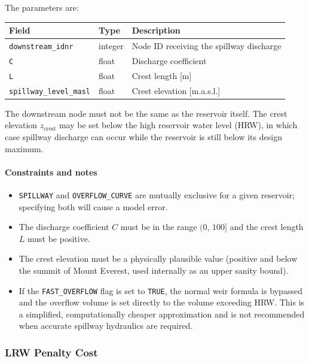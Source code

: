 \documentclass[a4paper, 12pt]{report}
\begin{document}
	\noindent The parameters are:
	\begin{center}
		\begin{tabular}{lll}
			\hline
			Field & Type & Description \\
			\hline
			\texttt{downstream\_idnr}      & integer & Node ID receiving the spillway discharge \\
			\texttt{C}                     & float   & Discharge coefficient \\
			\texttt{L}                     & float   & Crest length [m] \\
			\texttt{spillway\_level\_masl} & float   & Crest elevation [m.a.s.l.] \\
			\hline
		\end{tabular}
	\end{center}

	The downstream node must not be the same as the reservoir itself. The crest elevation $z_\text{crest}$ may be set below the high reservoir water level (HRW), in which case spillway discharge can occur while the reservoir is still below its design maximum.

	\paragraph{Constraints and notes}

	\begin{itemize}
	\item \texttt{SPILLWAY} and \texttt{OVERFLOW\_CURVE} are mutually exclusive for a given reservoir; specifying both will cause a model error.
	\item The discharge coefficient $C$ must be in the range $(0,\,100]$ and the crest length $L$ must be positive.
	\item The crest elevation must be a physically plausible value (positive and below the summit of Mount Everest, used internally as an upper sanity bound).
	\item If the \texttt{FAST\_OVERFLOW} flag is set to \texttt{TRUE}, the normal weir formula is bypassed and the overflow volume is set directly to the volume exceeding HRW. This is a simplified, computationally cheaper approximation and is not recommended when accurate spillway hydraulics are required.
	\end{itemize}




	\subsubsection{LRW Penalty Cost}
	\label{subsubsec:lrw_penalty}
\end{document}
